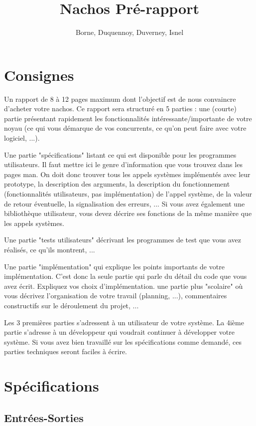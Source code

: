\documentclass[11pt]{article}
\author{Borne, Duquennoy, Duverney, Isnel}
\date{}
\title{Nachos Pré-rapport}
\begin{document}
\maketitle
\section{Consignes}
Un rapport de 8 à 12 pages maximum dont l'objectif est de nous convaincre d'acheter votre nachos. Ce rapport sera structuré en 5 parties :
une (courte) partie présentant rapidement les fonctionnalités intéressante/importante de votre noyau (ce qui vous démarque de vos concurrents, ce qu'on peut faire avec votre logiciel, ...).

Une partie "spécifications" listant ce qui est disponible pour les programmes utilisateurs.
Il faut mettre ici le genre d'information que vous trouvez dans les pages man.
On doit donc trouver tous les appels systèmes implémentés avec leur prototype, la description des arguments,
la description du fonctionnement (fonctionnalités utilisateurs, pas implémentation) de l'appel système,
de la valeur de retour éventuelle, la signalisation des erreurs, ...
Si vous avez également une bibliothèque utilisateur, vous devez décrire ses fonctions de la même manière que les appels systèmes.

Une partie "tests utilisateurs" décrivant les programmes de test que vous avez réalisés, ce qu'ils montrent, ...

Une partie "implémentation" qui explique les points importants de votre implémentation. C'est donc la seule partie qui parle du détail du code que vous avez écrit. Expliquez vos choix d'implémentation.
une partie plus "scolaire" où vous décrivez l'organisation de votre travail (planning, ...), commentaires constructifs sur le déroulement du projet, ...

Les 3 premières parties s'adressent à un utilisateur de votre système. La 4ième partie s'adresse à un développeur qui voudrait continuer à développer votre système. Si vous avez bien travaillé sur les spécifications comme demandé, ces parties techniques seront faciles à écrire.









\section{Spécifications}
\subsection{Entrées-Sorties}
\end{document}
